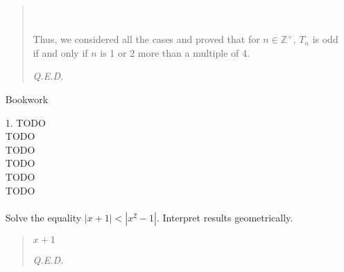 \documentclass[12pt, a4paper]{article}                      %
\newcommand{\intzp}{\mathbb{Z^+}}
\begin{document}
\begin{itemize}
\begin{quote}
\\\\
Thus, we considered all the cases and proved that for $n \in \intzp$, $T_n$ is odd if and only if $n$ is 1 or 2 more
than a multiple of $4$.
\begin{flushright}
\textit{Q.E.D.}
\end{flushright}
\end{quote}
\newpage
{\large Bookwork}
\item[1.]
TODO\\
TODO\\
TODO\\
TODO\\
TODO\\
TODO\\
\\
Solve the equality $|x + 1| < |x^2 - 1|$. Interpret results geometrically.
\begin{quote}
$x + 1$ 
\begin{flushright}
\textit{Q.E.D.}
\end{flushright}
\end{quote}
\end{itemize}
\end{document}

